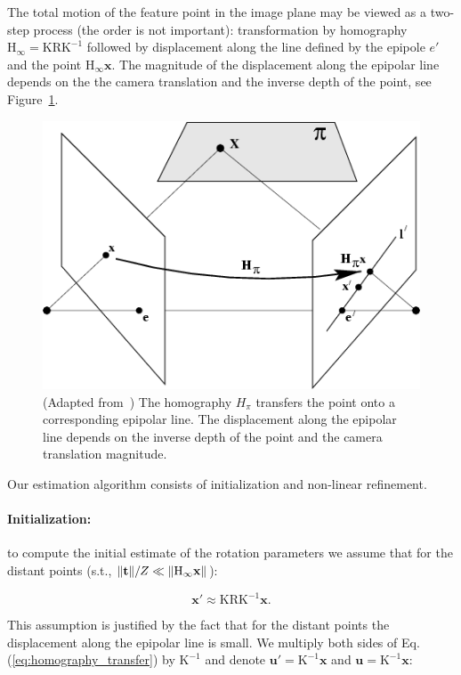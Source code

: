 \documentclass{bmvc2k}
\DeclarePairedDelimiter{\norm}{\lVert}{\rVert}
\begin{document}
The total motion of the feature point in the image plane may be viewed
as a two-step process (the order is not important): transformation by
homography $\mathrm{H_\infty} = \mathrm{KRK^{-1}}$ followed by
displacement along the line defined by the epipole $e'$ and the point
$\mathrm{H_\infty}\mathbf{x}$.  The magnitude of the displacement
along the epipolar line depends on the the camera translation and the
inverse depth of the point, see Figure~\ref{fig:feature_motion}.

\begin{figure}[h]
  \centering
  \includegraphics[scale=.5]{fig85_adapted}
  \caption{(Adapted from~\cite{Hartley2004}) The homography $H_\pi$ transfers the point onto a corresponding epipolar line.  The displacement along the epipolar line depends on the inverse depth of the point and the camera translation magnitude.}
  \label{fig:feature_motion}
\end{figure}                                                             %

Our estimation algorithm consists of initialization and non-linear
refinement.
\paragraph{Initialization:} to compute the initial estimate of the rotation
parameters we assume that for the distant points (s.t., $\norm{\mathbf{t}}/Z \ll \norm{\mathrm{H_\infty}\mathbf{x}}$):

\begin{equation}\label{eq:homography_transfer}
  \mathbf{x}' \approx \mathrm{KRK^{-1}}\mathbf{x}.
\end{equation}

This assumption is justified by the fact that for the distant points
the displacement along the epipolar line is small. We multiply
both sides of Eq. (\ref{eq:homography_transfer}) by $\mathrm{K^{-1}}$
and denote $\mathbf{u'} = \mathrm{K^{-1}}\mathbf{x}$ and
$\mathbf{u} = \mathrm{K^{-1}}\mathbf{x}$:
\end{document}
